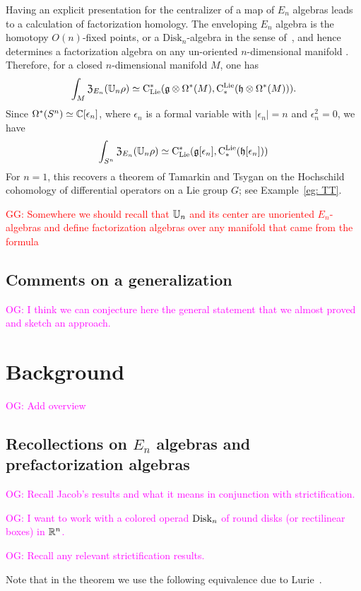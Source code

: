 \documentclass[11pt]{amsart}
\numberwithin{equation}{section}
\def\owen{\textcolor{magenta}{OG: }\textcolor{magenta}}
\def\greg{\textcolor{red}{GG: }\textcolor{red}}
\begin{document}
Having an explicit presentation for the centralizer of a map of $E_n$ algebras leads to a calculation of factorization homology.
The enveloping $E_n$ algebra is the homotopy $O(n)$-fixed points, or a $\mathrm{Disk}_n$-algebra in the sense of~\cite{AF},
and hence determines a factorization algebra on any un-oriented $n$-dimensional manifold \cite{Knudsen}.
Therefore, for a closed $n$-dimensional manifold $M$, one has
\[
\int_M {\frak Z}_{E_n}(\mathbb U_n \rho) \simeq {\rm C}_{\rm Lie}^*(\mathfrak g \otimes \Omega^*(M), {\rm C}^{\rm Lie}_*( \mathfrak h \otimes \Omega^*(M))).
\]
Since $\Omega^*(S^n) \simeq \mathbb C[\epsilon_n]$, where $\epsilon_n$ is a formal variable with $|\epsilon_n| = n$ and $\epsilon_n^2 = 0$, we have
\[
\int_{S^n} {\frak Z}_{E_n}(\mathbb U_n \rho) \simeq {\rm C}_{\rm Lie}^*(\mathfrak g[\epsilon_n], {\rm C}^{\rm Lie}_*( \mathfrak h[\epsilon_n]))
\]
For $n=1$, this recovers a theorem of Tamarkin and Tsygan \cite{TT} on the Hochschild cohomology of differential operators on a Lie group $G$;
see Example~\ref{eg: TT}. 

\greg{Somewhere we should recall that $\mathbb U_n$ and its center are unoriented $E_n$-algebras and define factorization algebras over any manifold that came from the formula}

\subsection{Comments on a generalization}

\owen{I think we can conjecture here the general statement that we almost proved and sketch an approach.}

\section{Background}

\owen{Add overview}

\subsection{Recollections on $E_n$ algebras and prefactorization algebras}
\label{sec: en background}

\owen{Recall Jacob's results and what it means in conjunction with strictification.}

\owen{I want to work with a colored operad ${\rm Disk}_n$ of round disks (or rectilinear boxes) in $\mathbb R^n$.}

\owen{Recall any relevant strictification results.}

Note that in the theorem we use the following equivalence due to Lurie~\cite{LurieHA}. 
\end{document}
